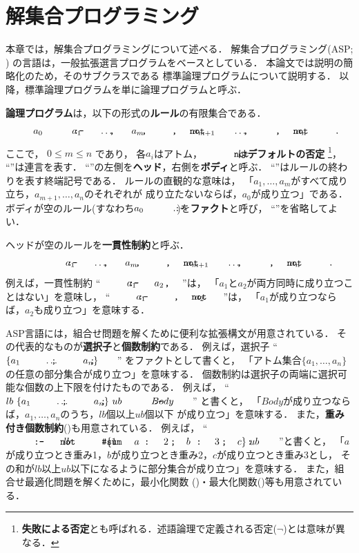 \chapter{解集合プログラミング}\label{chap:asp}

本章では，解集合プログラミングについて述べる．
解集合プログラミング(ASP; \cite{%
  Baral03:cambridge,%
  Gelfond88:iclp,%
  Niemela99:amai,%
  Inoue08:jssst})
の言語は，一般拡張選言プログラムをベースとしている．
本論文では説明の簡略化のため，そのサブクラスである
標準論理プログラムについて説明する．
以降，標準論理プログラムを単に論理プログラムと呼ぶ．

\textbf{論理プログラム}は，以下の形式の\textbf{ルール}の有限集合である．
\begin{equation}
 \label{eq:rule}
  a_0 ~\mcode{:-}~ a_1 \mcode{,} \dots \mcode{,} a_m \mcode{,} %
  \naf{a_{m+1}} \mcode{,} \dots \mcode{,} \naf{a_n}\mcode{.}
\end{equation}
ここで，
$0\leq m\leq n$ であり，
各$a_i$はアトム，
$\naf{}$は\textbf{デフォルトの否定}
\footnote{\textbf{失敗による否定}とも呼ばれる．述語論理で定義される否定($\neg$)とは意味が異なる．}，
``\mcode{,}''は連言を表す．
``\mcode{:-}''の左側を\textbf{ヘッド}，右側を\textbf{ボディ}と呼ぶ．
``''はルールの終わりを表す終端記号である．
ルールの直観的な意味は，
\!「\!$a_1,\ldots,a_m$がすべて成り立ち，$a_{m+1},\ldots,a_n$のそれぞれが
成り立たないならば，$a_0$が成り立つ」である．
ボディが空のルール(すなわち\(a_0~\mcode{:-}~.\))を\textbf{ファクト}と呼び，
``\mcode{:-}''を省略してよい．

ヘッドが空のルールを\textbf{一貫性制約}と呼ぶ．
\begin{equation}
  \label{eq:constr}
  \mcode{:-}~ a_1 \mcode{,} \dots \mcode{,} a_m \mcode{,} %
  \naf{a_{m+1}} \mcode{,} \dots \mcode{,} \naf{a_n}\mcode{.}
\end{equation}
例えば，一貫性制約
``\(\mcode{:-}~ a_1 \mcode{,} a_2 \mcode{.}\)''は，
\!「\!$a_1$と$a_2$が両方同時に成り立つことはない」を意味し，
``\(\mcode{:-}~ a_1 \mcode{,} \naf{a_{2}} \mcode{.}\)''は，
\!「\!$a_1$が成り立つならば，$a_2$も成り立つ」を意味する．

ASP言語には，組合せ問題を解くために便利な拡張構文が用意されている．
その代表的なものが\textbf{選択子}と\textbf{個数制約}である．
例えば，選択子
``\(\{a_1~\mcode{;}~\dots~\mcode{;}~a_n\}\mcode{.}\)''
をファクトとして書くと，
\!「\!アトム集合\(\{a_1,\dots,a_n\}\)の任意の部分集合が成り立つ」を意味する．
個数制約は選択子の両端に選択可能な個数の上下限を付けたものである．
例えば，
``\(lb\ \{a_1~\mcode{;}~\dots~\mcode{;}~a_n\}\ ub ~\mcode{:-}~ Body\mcode{.}\)''
と書くと，
\!「\!$Body$が成り立つならば，$a_1,\dots,a_n$のうち，$lb$個以上$ub$個以下
が成り立つ」を意味する．
また，\textbf{重み付き個数制約}()も用意されている．
例えば，
``\(\mcode{:-}~ \naf{lb\ \mcode{\#sum} %
\{1\mcode{:}a~\mcode{;}~2\mcode{:}b~\mcode{;}~3\mcode{:}c\}\ ub}\mcode{.}\)''と書くと，
\!「\!$a$が成り立つとき重み1，$b$が成り立つとき重み2，$c$が成り立つとき重み3とし，
その和が$lb$以上$ub$以下になるように部分集合が成り立つ」を意味する．
また，組合せ最適化問題を解くために，最小化関数
()・最大化関数()等も用意されている．

